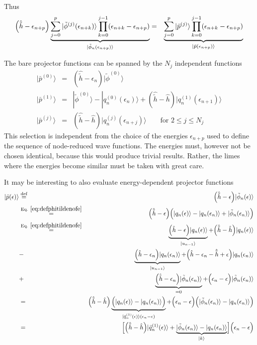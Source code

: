 \documentclass[11pt,a4paper]{report}
\begin{document}
Thus
\begin{eqnarray}
\Bigl(\hat{\tilde{h}}-\epsilon_{n+p}\Bigr)
\underbrace{\sum_{j=0}^{p}|\tilde{\phi}^{(j)}(\epsilon_{n+k})\rangle
\prod_{k=0}^{j-1}(\epsilon_{n+k}-\epsilon_{n+p})}
_{|\tilde{\phi}_n(\epsilon_{n+p})\rangle}
&=&\underbrace{\sum_{j=0}^{p}|\bar{p}^{(j)}\rangle
\prod_{k=0}^{j-1}(\epsilon_{n+k}-\epsilon_{n+p})
}_{|\bar{p}(\epsilon_{n+p})\rangle}
\end{eqnarray}




The bare projector functions can be spanned by the $N_j$ independent functions
\begin{eqnarray}
|\bar{p}^{(0)}\rangle&=&(\hat{\tilde{h}}-\epsilon_{n})|\tilde{\phi}^{(0)}\rangle
\nonumber\\
|\bar{p}^{(1)}\rangle&=&|\tilde{\phi}^{(0)}\rangle-|q_n^{(0)}(\epsilon_n)\rangle
+(\hat{\tilde{h}}-\hat{h})
|q_n^{(1)}(\epsilon_{n+1})\rangle
\nonumber\\
|\bar{p}^{(j)}\rangle&=&(\hat{\tilde{h}}-\hat{h})|q_n^{(j)}(\epsilon_{n+j})\rangle
\qquad\text{for $2\le j\le N_j$}
\end{eqnarray}
This selection is independent from the choice of the energies
$\epsilon_{n+p}$ used to define the sequence of node-reduced wave
functions. The energies must, however not be chosen identical, because
this would produce trivial results. Rather, the limes where the
energies become similar must be taken with great care.


It may be interesting to also evaluate energy-dependent projector
functions
\begin{eqnarray}
|\bar{p}(\epsilon)\rangle&\defas&
\Bigl(\hat{\tilde{h}}-\epsilon\Bigr)|\tilde{\phi}_n(\epsilon)\rangle
\nonumber\\
&\eqrel{eq:defphitildenofe}{=}&
\Bigl(\hat{\tilde{h}}-\epsilon\Bigr)
\Bigl(|q_n(\epsilon)\rangle-|q_n(\epsilon_n)\rangle+
|\tilde{\phi}_n(\epsilon_n)\rangle\Bigr)
\nonumber\\
&\eqrel{eq:defphitildenofe}{=}&
\underbrace{\Bigl(\hat{h}-\epsilon\Bigr)|q_n(\epsilon)\rangle}_{|u_{n-1}\rangle}
+\Bigl(\hat{\tilde{h}}-\hat{h}\Bigr)|q_n(\epsilon)\rangle
\nonumber\\
&-&\underbrace{
\Bigl(\hat{h}-\epsilon_n\Bigr)|q_n(\epsilon_n)\rangle}_{|u_{n-1}\rangle}
+\Bigl(\hat{h}-\epsilon_n-\hat{\tilde{h}}+\epsilon\Bigr)|q_n(\epsilon_n)\rangle
\nonumber\\
&+&\underbrace{\Bigl(\hat{\tilde{h}}-\epsilon_n\Bigr)|\tilde{\phi}_n(\epsilon_n)\rangle}_{=0}
+\Bigl(\epsilon_n-\epsilon\Bigr)|\tilde{\phi}_n(\epsilon_n)\rangle
\nonumber\\
&=&\Bigl(\hat{\tilde{h}}-\hat{h}\Bigr)
\underbrace{
\Bigl(|q_n(\epsilon)\rangle-|q_n(\epsilon_n)\rangle\Bigr)
}_{|\bar{q}_n^{(1)}(\epsilon)\rangle(\epsilon_n-\epsilon)}
+\Bigl(\epsilon_n-\epsilon\Bigr)
\Bigl(|\tilde{\phi}_n(\epsilon_n)\rangle
-|q_n(\epsilon_n)\rangle\Bigr)
\nonumber\\
&=&\Bigl[
\Bigl(\hat{\tilde{h}}-\hat{h}\Bigr)
|\bar{q}_n^{(1)}(\epsilon)\rangle
+
\underbrace{|\tilde{\phi}_n(\epsilon_n)\rangle
-|q_n(\epsilon_n)\rangle}_{|k\rangle}\Bigr]
\Bigl(\epsilon_n-\epsilon\Bigr)
\end{eqnarray}
\end{document}

